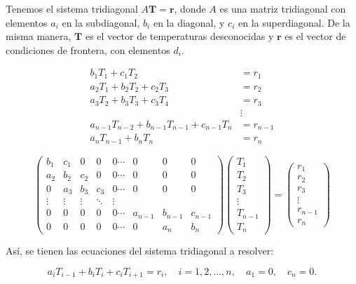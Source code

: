 \documentclass[11pt,a4paper]{article}
\begin{document}
Tenemos el sistema tridiagonal $A \mathbf{T} = \mathbf{r}$, donde $A$ es 
una matriz tridiagonal con elementos $a_i$ en la subdiagonal, $b_i$ en la diagonal,
y $c_i$ en la superdiagonal. De la misma manera, $\mathbf{T}$ es el vector de 
temperaturas desconocidas y $\mathbf{r}$ es el vector de condiciones de frontera,
con elementos $d_i$.

\begin{align*}
b_1 T_1 + c_1 T_2 &= r_1 \\
a_2 T_1 + b_2 T_2 + c_2 T_3 &= r_2 \\
a_3 T_2 + b_3 T_3 + c_3 T_4 &= r_3 \\
&\vdots \\
a_{n-1} T_{n-2} + b_{n-1} T_{n-1} + c_{n-1} T_n &= r_{n-1} \\
a_n T_{n-1} + b_n T_n &= r_n
\end{align*}

\begin{equation}
\begin{pmatrix}
b_1 & c_1 & 0 & 0 & 0  \cdots & 0 & 0 & 0 \\
a_2 & b_2 & c_2 & 0 & 0  \cdots & 0 & 0 & 0 \\
0 & a_3 & b_3 & c_3 & 0  \cdots & 0 & 0 & 0 \\
\vdots & \vdots & \vdots & \ddots & \vdots \\
0 & 0 & 0 & 0 & 0  \cdots & a_{n-1} & b_{n-1} & c_{n-1} \\
0 & 0 & 0 & 0 & 0  \cdots & 0 & a_n & b_n
\end{pmatrix}
\begin{pmatrix}T_1 \\
T_2 \\
T_3 \\
\vdots \\
T_{n-1} \\
T_n
\end{pmatrix}
=
\begin{pmatrix}r_1 \\
r_2 \\
r_3 \\
\vdots \\
r_{n-1} \\
r_n
\end{pmatrix}
\end{equation}

As\'i, se tienen las ecuaciones del sistema tridiagonal a resolver:

\begin{equation}
a_i T_{i-1}+b_iT_i+c_iT_{i+1}=r_i,
\quad i=1,2,\ldots,n, \quad a_1=0, \quad c_n=0.
\end{equation}
\end{document}
